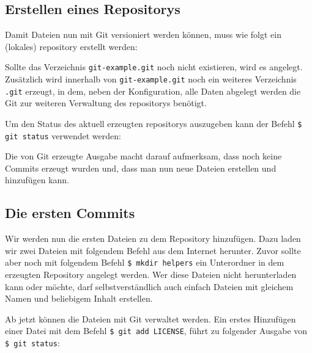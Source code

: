 \subsection{Erstellen eines Repositorys}\label{startup}
Damit Dateien nun mit Git versioniert werden können, muss wie folgt ein
(lokales) \gls{repository} erstellt werden:



Sollte das Verzeichnis \texttt{git-example.git} noch nicht existieren, wird
es angelegt. Zusätzlich wird innerhalb von \texttt{git-example.git} noch ein
weiteres Verzeichnis \texttt{.git} erzeugt, in dem, neben der Konfiguration,
alle Daten abgelegt werden die Git zur weiteren Verwaltung des \glspl{repository}
benötigt.

Um den Status des aktuell erzeugten \glspl{repository} auszugeben kann der
Befehl \texttt{\$ git status} verwendet werden:



Die von Git erzeugte Ausgabe macht darauf aufmerksam, dass noch keine Commits
erzeugt wurden und, dass man nun neue Dateien erstellen und hinzufügen kann.

\subsection{Die ersten Commits}\label{sec:first_commits}

Wir werden nun die ersten Dateien zu dem Repository hinzufügen. Dazu laden wir
zwei Dateien mit folgendem Befehl aus dem Internet herunter. Zuvor sollte aber
noch mit folgendem Befehl \texttt{\$ mkdir helpers} ein Unterordner in dem
erzeugten Repository angelegt werden. Wer diese Dateien nicht herunterladen
kann oder möchte, darf selbstverständlich auch einfach Dateien mit gleichem
Namen und beliebigem Inhalt erstellen.



Ab jetzt können die Dateien mit Git verwaltet werden. Ein erstes Hinzufügen
einer Datei mit dem Befehl \texttt{\$ git add LICENSE}, führt zu folgender
Ausgabe von \texttt{\$ git status}:



